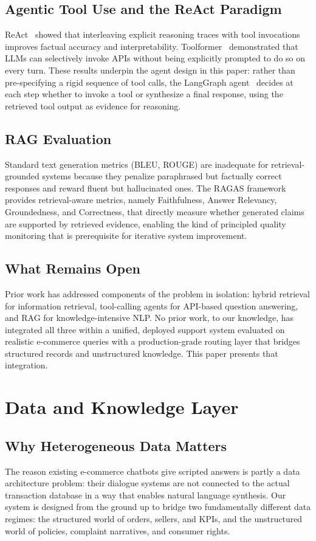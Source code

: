 \documentclass[conference]{IEEEtran}
\begin{document}
\subsection{Agentic Tool Use and the ReAct Paradigm}
ReAct~\cite{b16} showed that interleaving explicit reasoning traces with tool
invocations improves factual accuracy and interpretability. Toolformer~\cite{b17}
demonstrated that LLMs can selectively invoke APIs without being explicitly prompted
to do so on every turn. These results underpin the agent design in this paper:
rather than pre-specifying a rigid sequence of tool calls, the LangGraph
agent~\cite{b20} decides at each step whether to invoke a tool or synthesize a
final response, using the retrieved tool output as evidence for reasoning.

\subsection{RAG Evaluation}
Standard text generation metrics (BLEU, ROUGE) are inadequate for retrieval-grounded
systems because they penalize paraphrased but factually correct responses and reward
fluent but hallucinated ones. The RAGAS framework~\cite{b18} provides
retrieval-aware metrics, namely Faithfulness, Answer Relevancy, Groundedness, and
Correctness, that directly measure whether generated claims are supported by
retrieved evidence, enabling the kind of principled quality monitoring that is
prerequisite for iterative system improvement.

\subsection{What Remains Open}
Prior work has addressed components of the problem in isolation: hybrid retrieval
for information retrieval, tool-calling agents for API-based question answering,
and RAG for knowledge-intensive NLP. No prior work, to our knowledge, has integrated
all three within a unified, deployed support system evaluated on realistic e-commerce
queries with a production-grade routing layer that bridges structured records and
unstructured knowledge. This paper presents that integration.

\section{Data and Knowledge Layer}

\subsection{Why Heterogeneous Data Matters}
The reason existing e-commerce chatbots give scripted answers is partly a data
architecture problem: their dialogue systems are not connected to the actual
transaction database in a way that enables natural language synthesis. Our system
is designed from the ground up to bridge two fundamentally different data regimes:
the structured world of orders, sellers, and KPIs, and the unstructured world of
policies, complaint narratives, and consumer rights.
\end{document}
